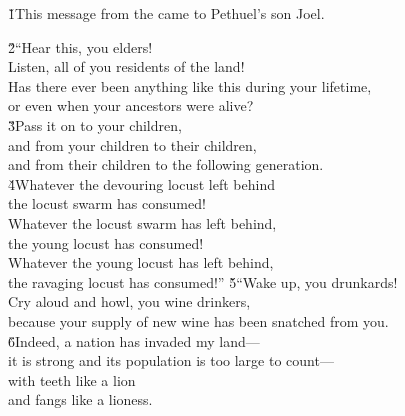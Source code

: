 


\v{1}This message from the  came to Pethuel's son Joel.

\begin{poetry}
\poeml \v{2}``Hear this, you elders! \\
\poeml Listen, all of you residents of the land! \\
\poeml Has there ever been anything like this during your lifetime, \\
\poemll    or even when your ancestors were alive? \\
\poeml \v{3}Pass it on to your children, \\
\poemll    and from your children to their children, \\
\poemlll       and from their children to the following generation. \\
\poeml \v{4}Whatever the devouring locust left behind \\
\poemll    the locust swarm has consumed! \\
\poeml Whatever the locust swarm has left behind, \\
\poemll    the young locust has consumed! \\
\poeml Whatever the young locust has left behind, \\
\poemll    the ravaging locust has consumed!''
\poeml \v{5}``Wake up, you drunkards! \\
\poemll    Cry aloud and howl, you wine drinkers, \\
\poemlll       because your supply of new wine has been snatched from you. \\
\poeml \v{6}Indeed, a nation has invaded my land--- \\
\poemll    it is strong and its population is too large to count--- \\
\poeml with teeth like a lion \\
\poemll    and fangs like a lioness. \\

\end{poetry}
